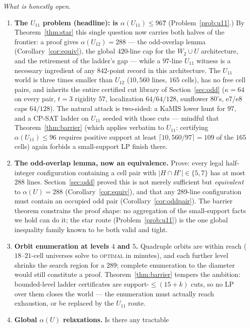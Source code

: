 \documentclass[11pt]{article}
\theoremstyle{remark}
\begin{document}
\emph{What is honestly open.}
\begin{enumerate}
\item \textbf{The $U_{11}$ problem (headline): is $\alpha(U_{11})\le96$?}
(Problem~\ref{prob:u11}.) By Theorem~\ref{thm:star} this single question
now carries both halves of the frontier: a proof gives
$\alpha(U_{12})=288$ --- the odd-overlap lemma
(Corollary~\ref{cor:equiv}), the global $420$-line cap for the
$W_2\cup U$ architecture, and the retirement of the ladder's gap --- while
a $97$-line $U_{11}$ witness is a necessary ingredient of any $842$-point
record in this architecture. The $U_{11}$ world is three times smaller
than $U_{12}$ ($10{,}560$ lines, $165$ cells), has no free cell pairs, and
inherits the entire certified cut library of Section~\ref{sec:odd}
($\kappa=64$ on every pair, $t{=}3$ rigidity $57$, localization
$64/64/128$, sunflower $80$'s, e7/e8 caps $64/128$). The natural attack is
two-sided: a KaMIS lower hunt for $97$, and a CP-SAT ladder on $U_{11}$
seeded with those cuts --- mindful that Theorem~\ref{thm:barrier} (which
applies verbatim to $U_{11}$: certifying $\alpha(U_{11})\le96$ requires
positive support at least $\lceil 10{,}560/97\rceil=109$ of the $165$
cells) again forbids a small-support LP finish there.
\item \textbf{The odd-overlap lemma, now an equivalence.} Prove: every
legal half-integer configuration containing a cell pair with
$|H\cap H'|\in\{5,7\}$ has at most $288$ lines. Section~\ref{sec:odd}
proved this is not merely sufficient but \emph{equivalent} to
$\alpha(U)=288$ (Corollary~\ref{cor:equiv}), and that any $289$-line
configuration must contain an occupied odd pair
(Corollary~\ref{cor:oddpair}). The barrier theorem constrains the proof
shape: no aggregation of the small-support facts we hold can do it; the
star route (Problem~\ref{prob:u11}) is the one global inequality family
known to be both valid and tight.
\item \textbf{Orbit enumeration at levels $4$ and $5$.} Quadruple orbits
are within reach ($18$--$21$-cell universes solve to \textsc{optimal} in
minutes), and each further level shrinks the search region for a $289$;
complete enumeration to the diameter would still constitute a proof.
Theorem~\ref{thm:barrier} tempers the ambition: bounded-level ladder
certificates are support-$\le(15{+}k)$ cuts, so no LP over them closes the
world --- the enumeration must actually reach exhaustion, or be replaced
by the $U_{11}$ route.
\item \textbf{Global $\alpha(U)$ relaxations.} Is there any tractable

\end{enumerate}
\end{document}
